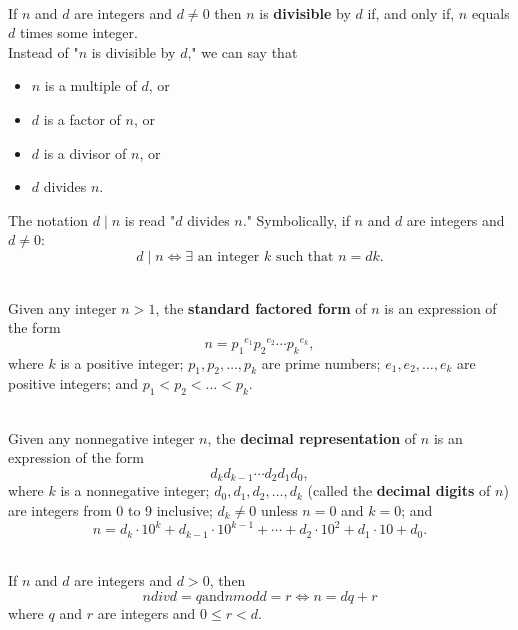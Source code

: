 \documentclass[12pt]{article}
\begin{document}
\begin{definition}[Divisibility]
\hfill\\
\normalfont If $n$ and $d$ are integers and $d\neq 0$ then $n$ is \textbf{divisible} by $d$ if, and only if, $n$ equals $d$ times some integer.\\
Instead of "$n$ is divisible by $d$," we can say that\\
\vspace{-5mm}
\begin{itemize}
\itemsep0em
\item[] $n$ is a multiple of $d$, or
\item[] $d$ is a factor of $n$, or
\item[] $d$ is a divisor of $n$, or
\item[] $d$ divides $n$.
\end{itemize}
The notation $d \mid n$ is read "$d$ divides $n$." Symbolically, if $n$ and $d$ are integers and $d\neq0$:
\[
d \mid n \Leftrightarrow \exists \text{ an integer }k \text{ such that } n = dk.
\]
\end{definition}
\begin{definition}
\hfill\\
\normalfont Given any integer $n > 1$, the \textbf{standard factored form} of $n$ is an expression of the form
\[n = {p_1}^{e_1} {p_2}^{e_2} \cdots{p_k}^{e_k},\]
where $k$ is a positive integer; $p_1 , p_2 ,\ldots, p_k$ are prime numbers; $e_1 , e_2 ,\ldots, e_k$ are positive integers; and $p_1 < p_2 <\ldots< p_k$.
\end{definition}
\begin{definition}
\hfill\\
\normalfont Given any nonnegative integer $n$, the \textbf{decimal
representation} of $n$ is an expression of the form
\[d_k d_{k-1} \cdots d_2 d_1 d_0,\]
where $k$ is a nonnegative integer; $d_0, d_1, d_2,\ldots, d_k$ (called
the \textbf{decimal digits} of $n$) are integers from 0 to 9 inclusive;
$d_k \neq 0$ unless $n = 0$ and $k = 0$; and
\[n = d_k ·10^k + d_{k-1} ·10^{k-1} +\cdots+ d_2 ·10^2 + d_1 ·10 + d_0.\]
\end{definition}
\begin{definition}
\hfill\\
\normalfont If $n$ and $d$ are integers and $d > 0$, then
\[ n div d = q \text{and} n mod d = r \Leftrightarrow n = dq + r\]
where $q$ and $r$ are integers and $0 \leq r < d$.
\end{definition}
\end{document}
